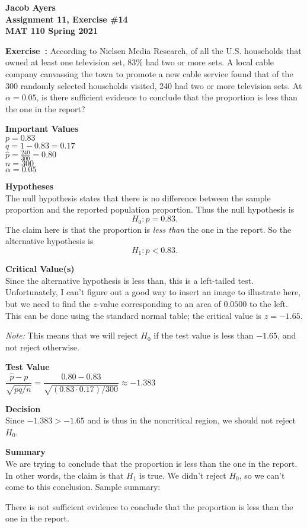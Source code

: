 \documentclass[12pt]{letter}
\author{Jacob Ayers}
\newcommand{\?}{\stackrel{?}{=}}
\newcounter{exercise}
\newenvironment{exercise}[1][]{\begin{framed}\refstepcounter{exercise}\textbf{Exercise~\theexercise:} #1}{\end{framed}}
\begin{document}
	
	\textbf{Jacob Ayers \\ Assignment 11, Exercise \#14 \\ MAT 110 Spring 2021}
	
	\begin{exercise}
		According to Nielsen Media Research, of all the U.S. households that owned at least one television set, 83\% had two or more sets. A local cable company canvassing the town to promote a new cable service found that of the 300 randomly selected households visited, 240 had two or more television sets. At $\alpha = 0.05$, is there sufficient evidence to conclude that the proportion is less than the one in the report?
	\end{exercise}
	
	\textbf{Important Values} \\
	$p = 0.83$ \\ $q = 1 - 0.83 = 0.17$ \\ $\hat{p} = \frac{240}{300} = 0.80$ \\ $n = 300$ \\ $\alpha = 0.05$
	
	\textbf{Hypotheses} \\
	The null hypothesis states that there is no difference between the sample proportion and the reported population proportion.
	Thus the null hypothesis is $$H_0: p = 0.83.$$
	The claim here is that the proportion is \textit{less than} the one in the report.
	So the alternative hypothesis is $$H_1: p < 0.83.$$
	
	\textbf{Critical Value(s)} \\
	Since the alternative hypothesis is less than, this is a left-tailed test. Unfortunately, I can't figure out a good way to insert an image to illustrate here, but we need to find the $z$-value corresponding to an area of $0.0500$ to the left. This can be done using the standard normal table; the critical value is $z = -1.65$.
	
	\textit{Note:} This means that we will reject $H_0$ if the test value is less than $-1.65$, and not reject otherwise.
	
	\textbf{Test Value} \\
	$\dfrac{\hat{p} - p}{\sqrt{pq / n}} = \dfrac{0.80 - 0.83}{\sqrt{(0.83\cdot 0.17) / 300}} \approx -1.383$
	
	\textbf{Decision} \\
	Since $-1.383 > -1.65$ and is thus in the noncritical region, we should not reject $H_0$.
	
	\textbf{Summary} \\
	We are trying to conclude that the proportion is less than the one in the report. In other words, the claim is that $H_1$ is true. We didn't reject $H_0$, so we can't come to this conclusion. Sample summary:
	
	There is not sufficient evidence to conclude that the proportion is less than the one in the report.
	
\end{document}
